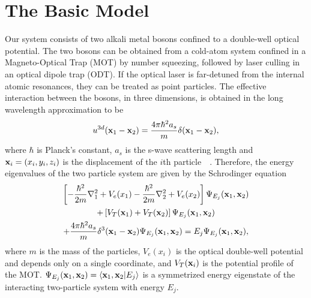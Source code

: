 \documentclass{article}
\begin{document}
\section{\label{sec:2} The Basic Model}
%
Our system consists of  two alkali metal bosons confined to a double-well optical potential. The two bosons can be obtained from  a cold-atom system confined in a Magneto-Optical Trap (MOT) by number squeezing, followed by laser culling in an optical dipole trap (ODT). If the optical laser is far-detuned from the internal atomic resonances, they can be treated as point particles. The effective interaction between the bosons, in three dimensions, is obtained in the long wavelength approximation to be 
%
\begin{equation}
u^{3d}({\bf x}_1-{\bf x}_2)= \frac{4\pi\hbar^2 a_s}{m} \delta({\bf x}_1-{\bf x}_2),
\end{equation}
%
where ${\hbar}$ is Planck's constant, $a_s$ is the s-wave scattering length and ${\bf  x}_i = \left(  x_i,y_i,z_i \right) $ is the displacement of the $i$th particle~\cite{metcalf:vanderstraten}~\cite{pethick:bec}. Therefore, the energy eigenvalues of the two particle system are given by the Schrodinger equation 
%
\begin{multline}
\left[ -\frac{\hbar^2}{2m}\nabla^2_1 +V_e(x_1)-\frac{\hbar^2}{2m}\nabla^2_2 +V_e(x_2)\right] 
\Psi_{E_j}({\bf x}_1, {\bf x}_2) \\
 +  \left[V_T({\bf x}_1)+V_T({\bf x}_2)\right]\Psi_{E_j}({\bf x}_1, {\bf x}_2) \\
 +  \frac{4\pi\hbar^2 a_s}{m} \delta^3({\bf x}_1-{\bf x}_2)\Psi_{E_j}({\bf x}_1 ,{\bf x}_2) 
= E_j \Psi_{E_j}({\bf x}_1,{\bf x}_2) ,
\label{eq:3dsys}
\end{multline}
%
where $m$ is the mass of the particles, $V_e(x_i)$ is the optical double-well potential and depends only on a single coordinate, and $V_T({\bf x}_i)$ is the potential profile of the MOT. $\Psi_{E_j}({\bf x}_1,{\bf x}_2)={\langle}{\bf x}_1,{\bf x}_2|E_j{\rangle}$ is a symmetrized  energy eigenstate of the interacting two-particle system with energy $E_j$.
\end{document}
